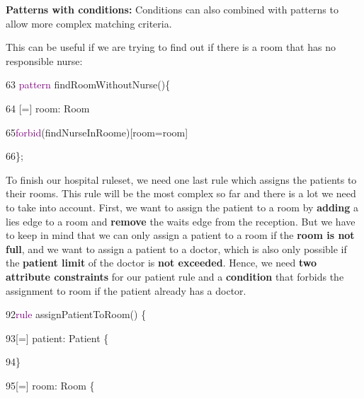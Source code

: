 {\textbf{Patterns with conditions:}\newline
Conditions can also combined with patterns to allow more complex matching criteria.

This can be useful if we are trying to find out if there is a room that has no responsible nurse:\newline

{

63 \hspace{0.5cm}\textcolor{Purple}{pattern} findRoomWithoutNurse()\{  

64\hspace{1cm} [=] room: Room

65\hspace{1cm}\textcolor{Purple}{forbid}(findNurseInRoome)[room=room] 

66\hspace{0.5cm}\};\newline\newline

}


\clearpage

To finish our hospital ruleset, we need one last rule which assigns the patients to their rooms. This rule will be the most complex so far and there is a lot we need to take into account.\newline
First, we want to assign the patient to a room by \textbf{adding} a \textsf{lies} edge to a room and \textbf{remove} the \textsf{waits} edge from the reception.\newline
But we have to keep in mind that we can only assign a patient to a room if the \textbf{room is not full}, and we want to assign a patient to a doctor, which is also only possible if the \textbf{patient limit} of the doctor is \textbf{not exceeded}. Hence, we need \textbf{two attribute constraints} for our patient rule and a \textbf{condition} that forbids the assignment to room if the patient already has a doctor.\newline\newline

{

92\hspace{0.5cm}\textcolor{Purple}{rule} assignPatientToRoom() \{

93\hspace{1cm}[=] patient: Patient \{

94\hspace{1cm}\}

95\hspace{1cm}[=] room: Room \{

}}
